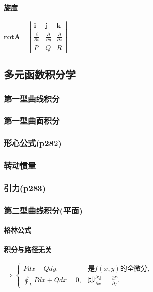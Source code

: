 ﻿\documentclass[a4paper,12pt,UTF8]{ctexart}
\begin{document}
    \paragraph{旋度} \(\mathbf{rot} \mathbf{A} = 
    \left|\begin{array}{cccc}
        \mathbf{i}& \mathbf{j}& \mathbf{k}\\
        \frac{\partial}{\partial x}& \frac{\partial}{\partial y}& \frac{\partial}{\partial z}\\
        P& Q& R
    \end{array}\right|\)
    
    \subsection{多元函数积分学}
    
    \subsubsection{第一型曲线积分}
    
    \subsubsection{第一型曲面积分}
    
    \subsubsection{形心公式(p282)}
    
    \subsubsection{转动惯量}

    \subsubsection{引力(p283)}

    \subsubsection{第二型曲线积分(平面)}

    \paragraph{格林公式}

    \paragraph{积分与路径无关}
    \(\Rightarrow \begin{cases}
        Pdx+Qdy,& \text{是} f(x, y) \text{的全微分},\\
        \oint_{L} Pdx+Qdx = 0,& \text{即} \frac{\partial Q}{\partial x} = \frac{\partial P}{\partial y}.
    \end{cases}\)
\end{document}
